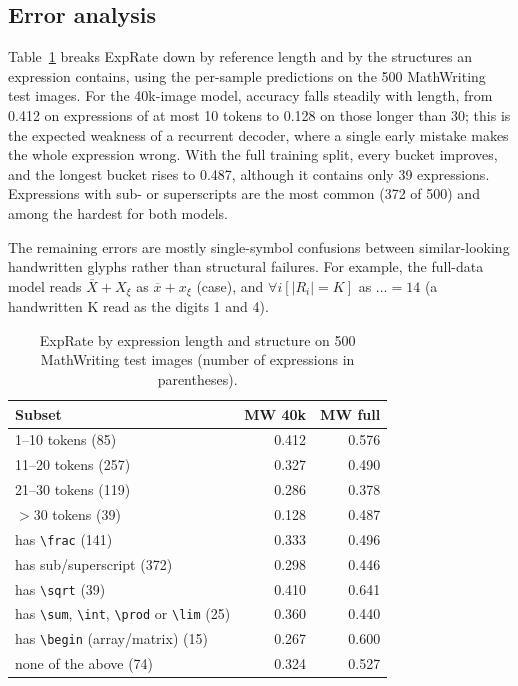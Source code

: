 \documentclass[conference]{IEEEtran}
\begin{document}
\subsection{Error analysis}
Table~\ref{tab:errors} breaks ExpRate down by reference length and by the structures an expression contains, using the per-sample predictions on the 500 MathWriting test images. For the 40k-image model, accuracy falls steadily with length, from 0.412 on expressions of at most 10 tokens to 0.128 on those longer than 30; this is the expected weakness of a recurrent decoder, where a single early mistake makes the whole expression wrong. With the full training split, every bucket improves, and the longest bucket rises to 0.487, although it contains only 39 expressions. Expressions with sub- or superscripts are the most common (372 of 500) and among the hardest for both models.

The remaining errors are mostly single-symbol confusions between similar-looking handwritten glyphs rather than structural failures. For example, the full-data model reads $\overline{X}+X_{\xi}$ as $\overline{x}+x_{\xi}$ (case), and $\forall i[|R_i|=K]$ as $\ldots=14$ (a handwritten K read as the digits 1 and 4).

\begin{table}[t]
\caption{ExpRate by expression length and structure on 500 MathWriting test images (number of expressions in parentheses).}
\label{tab:errors}
\centering
\setlength{\tabcolsep}{4pt}
\begin{tabular}{lrr}
\toprule
Subset & MW 40k & MW full \\
\midrule
1--10 tokens (85) & 0.412 & 0.576 \\
11--20 tokens (257) & 0.327 & 0.490 \\
21--30 tokens (119) & 0.286 & 0.378 \\
$>$30 tokens (39) & 0.128 & 0.487 \\
\midrule
has \verb|\frac| (141) & 0.333 & 0.496 \\
has sub/superscript (372) & 0.298 & 0.446 \\
has \verb|\sqrt| (39) & 0.410 & 0.641 \\
has \verb|\sum|, \verb|\int|, \verb|\prod| or \verb|\lim| (25) & 0.360 & 0.440 \\
has \verb|\begin| (array/matrix) (15) & 0.267 & 0.600 \\
none of the above (74) & 0.324 & 0.527 \\
\bottomrule
\end{tabular}
\end{table}
\end{document}
